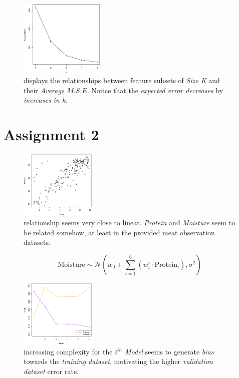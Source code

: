 \documentclass[a4paper, twocolumn]{article}
\begin{document}
    \begin{figure}[h!]
        \centering
        \label{fig:kvsmse}
        \caption{displays the relationships between feature subsets of \emph{Size K} and their \emph{Average $M.S.E$}. Notice that the \emph{expected error decreases} by \emph{increases in k}.}
        \includegraphics[width=0.36\textwidth]
        {share/kvsmse.eps}
    \end{figure}

    \newpage

    \section*{Assignment 2}

    \begin{figure}[h!]
        \centering
        \label{fig:linear}
        \caption{relationship seems very close to linear. \emph{Protein} and \emph{Moisture} seem to be related somehow, at least in the provided meat observation datasets.}
        \includegraphics[width=0.32\textwidth]
        {share/linear.eps}
    \end{figure}

    \begin{equation} \label{eq:mse}
        \mathrm{Moisture} \sim \mathcal{N}(w_0 + \sum_{i=1}^6{(w_i^i \cdot \mathrm{Protein}_i)}, \sigma^2)
    \end{equation}

    \begin{figure}[h!]
        \centering
        \label{fig:depends}
        \caption{increasing complexity for the \emph{$i^{th}$ Model} seems to generate \emph{bias} towards the \emph{training dataset}, motivating the higher \emph{validation dataset} error rate.}
        \includegraphics[width=0.32\textwidth]
        {share/depends.eps}
    \end{figure}
\end{document}
